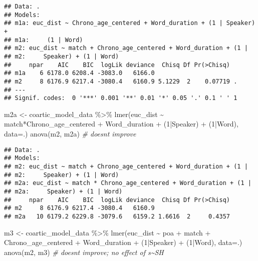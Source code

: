 \documentclass[
]{article}
\newenvironment{Shaded}{\begin{snugshade}}{\end{snugshade}}
\newcommand{\AttributeTok}[1]{\textcolor[rgb]{0.77,0.63,0.00}{#1}}
\newcommand{\CommentTok}[1]{\textcolor[rgb]{0.56,0.35,0.01}{\textit{#1}}}
\newcommand{\DecValTok}[1]{\textcolor[rgb]{0.00,0.00,0.81}{#1}}
\newcommand{\FunctionTok}[1]{\textcolor[rgb]{0.00,0.00,0.00}{#1}}
\newcommand{\NormalTok}[1]{#1}
\newcommand{\OtherTok}[1]{\textcolor[rgb]{0.56,0.35,0.01}{#1}}
\newcommand{\SpecialCharTok}[1]{\textcolor[rgb]{0.00,0.00,0.00}{#1}}
\begin{document}
\begin{verbatim}
## Data: .
## Models:
## m1a: euc_dist ~ Chrono_age_centered + Word_duration + (1 | Speaker) + 
## m1a:     (1 | Word)
## m2: euc_dist ~ match + Chrono_age_centered + Word_duration + (1 | 
## m2:     Speaker) + (1 | Word)
##     npar    AIC    BIC  logLik deviance  Chisq Df Pr(>Chisq)  
## m1a    6 6178.0 6208.4 -3083.0   6166.0                       
## m2     8 6176.9 6217.4 -3080.4   6160.9 5.1229  2    0.07719 .
## ---
## Signif. codes:  0 '***' 0.001 '**' 0.01 '*' 0.05 '.' 0.1 ' ' 1
\end{verbatim}

\begin{Shaded}
\begin{Highlighting}[]
\NormalTok{m2a }\OtherTok{\textless{}{-}}\NormalTok{ coartic\_model\_data }\SpecialCharTok{\%\textgreater{}\%}
  \FunctionTok{lmer}\NormalTok{(euc\_dist }\SpecialCharTok{\textasciitilde{}}\NormalTok{ match}\SpecialCharTok{*}\NormalTok{Chrono\_age\_centered }\SpecialCharTok{+} 
\NormalTok{         Word\_duration }\SpecialCharTok{+} 
\NormalTok{         (}\DecValTok{1}\SpecialCharTok{|}\NormalTok{Speaker) }\SpecialCharTok{+} 
\NormalTok{         (}\DecValTok{1}\SpecialCharTok{|}\NormalTok{Word), }
       \AttributeTok{data=}\NormalTok{.) }
\FunctionTok{anova}\NormalTok{(m2, m2a) }\CommentTok{\# doesn\textquotesingle{}t improve}
\end{Highlighting}
\end{Shaded}

\begin{verbatim}
## Data: .
## Models:
## m2: euc_dist ~ match + Chrono_age_centered + Word_duration + (1 | 
## m2:     Speaker) + (1 | Word)
## m2a: euc_dist ~ match * Chrono_age_centered + Word_duration + (1 | 
## m2a:     Speaker) + (1 | Word)
##     npar    AIC    BIC  logLik deviance  Chisq Df Pr(>Chisq)
## m2     8 6176.9 6217.4 -3080.4   6160.9                     
## m2a   10 6179.2 6229.8 -3079.6   6159.2 1.6616  2     0.4357
\end{verbatim}

\begin{Shaded}
\begin{Highlighting}[]
\NormalTok{m3 }\OtherTok{\textless{}{-}}\NormalTok{ coartic\_model\_data }\SpecialCharTok{\%\textgreater{}\%}
  \FunctionTok{lmer}\NormalTok{(euc\_dist }\SpecialCharTok{\textasciitilde{}}\NormalTok{ poa }\SpecialCharTok{+} 
\NormalTok{         match }\SpecialCharTok{+} 
\NormalTok{         Chrono\_age\_centered }\SpecialCharTok{+} 
\NormalTok{         Word\_duration }\SpecialCharTok{+} 
\NormalTok{         (}\DecValTok{1}\SpecialCharTok{|}\NormalTok{Speaker) }\SpecialCharTok{+} 
\NormalTok{         (}\DecValTok{1}\SpecialCharTok{|}\NormalTok{Word), }
       \AttributeTok{data=}\NormalTok{.) }
\FunctionTok{anova}\NormalTok{(m2, m3) }\CommentTok{\# doesn\textquotesingle{}t improve; no effect of s\textasciitilde{}SH }
\end{Highlighting}
\end{Shaded}
\end{document}
